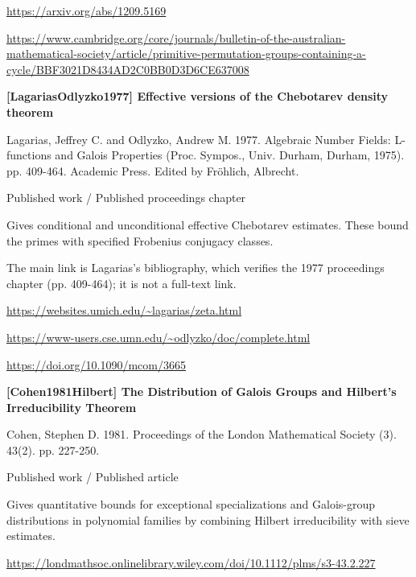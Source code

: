 \documentclass[11pt,a4paper,oneside,openany]{book}
\begin{document}
{\footnotesize\url{https://arxiv.org/abs/1209.5169}}\par
{\footnotesize\url{https://www.cambridge.org/core/journals/bulletin-of-the-australian-mathematical-society/article/primitive-permutation-groups-containing-a-cycle/BBF3021D8434AD2C0BB0D3D6CE637008}}\par
\vspace{9pt}
\hypertarget{ref:LagariasOdlyzko1977}{}
{\sffamily\bfseries\color{atlasgreen}[LagariasOdlyzko1977] Effective versions of the Chebotarev density theorem}\par
\color{black} Lagarias, Jeffrey C. and Odlyzko, Andrew M. 1977. Algebraic Number Fields: L-functions and Galois Properties (Proc. Sympos., Univ. Durham, Durham, 1975). pp. 409-464. Academic Press. Edited by Fröhlich, Albrecht.\par
{\small\sffamily\color{atlasgold}Published work / Published proceedings chapter}\par
\color{black} Gives conditional and unconditional effective Chebotarev estimates. These bound the primes with specified Frobenius conjugacy classes.\par
{\small The main link is Lagarias's bibliography, which verifies the 1977 proceedings chapter (pp. 409-464); it is not a full-text link.}\par
{\footnotesize\url{https://websites.umich.edu/~lagarias/zeta.html}}\par
{\footnotesize\url{https://www-users.cse.umn.edu/~odlyzko/doc/complete.html}}\par
{\footnotesize\url{https://doi.org/10.1090/mcom/3665}}\par
\vspace{9pt}
\hypertarget{ref:Cohen1981Hilbert}{}
{\sffamily\bfseries\color{atlasgreen}[Cohen1981Hilbert] The Distribution of Galois Groups and Hilbert's Irreducibility Theorem}\par
\color{black} Cohen, Stephen D. 1981. Proceedings of the London Mathematical Society (3). 43(2). pp. 227-250.\par
{\small\sffamily\color{atlasgold}Published work / Published article}\par
\color{black} Gives quantitative bounds for exceptional specializations and Galois-group distributions in polynomial families by combining Hilbert irreducibility with sieve estimates.\par
{\footnotesize\url{https://londmathsoc.onlinelibrary.wiley.com/doi/10.1112/plms/s3-43.2.227}}\par
\end{document}
